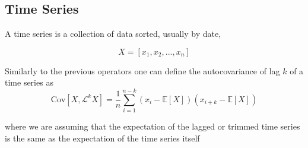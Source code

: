 \documentclass[•]{article}
\begin{document}
\subsection{Time Series}
A time series is a collection of data sorted, usually by date,

$$X = [x_1, x_2, ..., x_n] $$

Similarly to the previous operators one can define the autocovariance of lag $k$ of a time series as
\begin{equation}
\text{Cov}[X, \mathcal{L}^k X] = \frac{1}{n}\sum_{i=1}^{n-k} (x_i - \mathbb{E}[X])(x_{i+k} - \mathbb{E}[X])
\end{equation}

where we are assuming that the expectation of the lagged or trimmed time series is the same as the expectation of the time series itself
\end{document}
